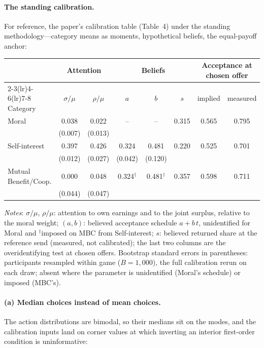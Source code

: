 \documentclass[11pt]{article}
\begin{document}
\paragraph{The standing calibration.} For reference, the paper's calibration table
(Table~4) under the standing methodology---category means as moments, hypothetical
beliefs, the equal-payoff anchor:

\begin{center}
\footnotesize
\renewcommand{\arraystretch}{1.15}
\begin{tabular}{l cc cc c cc}
\toprule
& \multicolumn{2}{c}{Attention} & \multicolumn{3}{c}{Beliefs} & \multicolumn{2}{c}{Acceptance at chosen offer} \\
\cmidrule(lr){2-3}\cmidrule(lr){4-6}\cmidrule(lr){7-8}
Category & $\sigma/\mu$ & $\rho/\mu$ & $a$ & $b$ & $s$ & implied & measured \\
\midrule
Moral & 0.038 & 0.022 & -- & -- & 0.315 & 0.565 & 0.795 \\
 & (0.007) & (0.013) &  &  & & & \\
Self-interest & 0.397 & 0.426 & 0.324 & 0.481 & 0.220 & 0.525 & 0.701 \\
 & (0.012) & (0.027) & (0.042) & (0.120) & & & \\
Mutual Benefit/Coop. & 0.000 & 0.048 & 0.324$^{\dagger}$ & 0.481$^{\dagger}$ & 0.357 & 0.598 & 0.711 \\
 & (0.044) & (0.047) &  &  & & & \\
\bottomrule
\end{tabular}

\smallskip
\begin{minipage}{0.95\textwidth}
\footnotesize\emph{Notes}: $\sigma/\mu$, $\rho/\mu$: attention to own earnings and to the joint surplus, relative
to the moral weight; $(a,b)$: believed acceptance schedule $a+b\,t$, unidentified for
Moral and $^{\dagger}$imposed on MBC from Self-interest; $s$: believed returned share
at the reference send (measured, not calibrated); the last two columns are the overidentifying test at chosen
offers. Bootstrap standard errors in parentheses: participants resampled within game
($B=1{,}000$), the full calibration rerun on each draw; absent where the parameter is
unidentified (Moral's schedule) or imposed (MBC's).
\end{minipage}
\end{center}

\paragraph{(a) Median choices instead of mean choices.} The action distributions are
bimodal, so their medians sit on the modes, and the calibration inputs land on corner
values at which inverting an interior first-order condition is uninformative:
\end{document}
